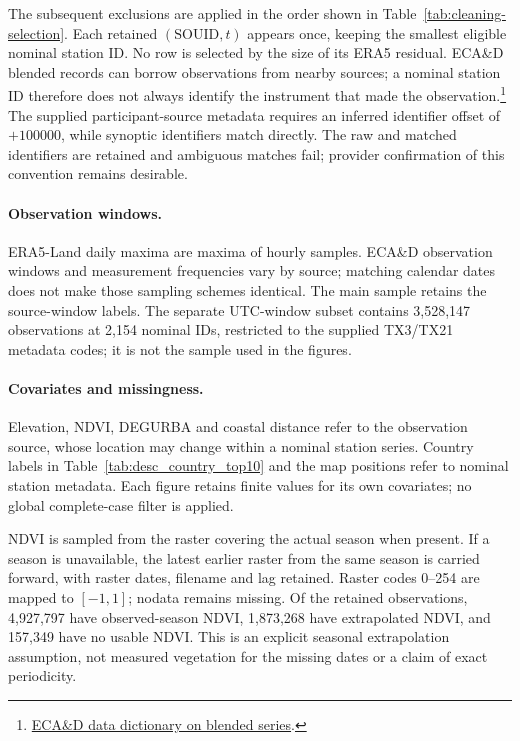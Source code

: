 \documentclass[a4paper,12pt,leqno]{article}
\begin{document}
The subsequent exclusions are applied in the order shown in
Table~\ref{tab:cleaning-selection}. Each retained $(\mathrm{SOUID},t)$
appears once, keeping the smallest eligible nominal station ID. No row
is selected by the size of its ERA5 residual. ECA\&D blended records can
borrow observations from nearby sources; a nominal station ID therefore
does not always identify the instrument that made the observation.\footnote{\href{https://www.ecad.eu/dailydata/datadictionary.php}{ECA\&D data dictionary on blended series}.}
The supplied participant-source metadata requires an inferred identifier
offset of $+100000$, while synoptic identifiers match directly. The raw
and matched identifiers are retained and ambiguous matches fail; provider
confirmation of this convention remains desirable.



\paragraph{Observation windows.}
ERA5-Land daily maxima are maxima of hourly samples. ECA\&D observation
windows and measurement frequencies vary by source; matching calendar
dates does not make those sampling schemes identical. The main sample
retains the source-window labels. The separate UTC-window subset contains
3,528,147 observations at 2,154 nominal IDs, restricted to the supplied
TX3/TX21 metadata codes; it is not the sample used in the figures.

\paragraph{Covariates and missingness.}
Elevation, NDVI, DEGURBA and coastal distance refer to the observation
source, whose location may change within a nominal station series.
Country labels in Table~\ref{tab:desc_country_top10} and the map positions
refer to nominal station metadata. Each figure retains finite values for
its own covariates; no global complete-case filter is applied.

NDVI is sampled from the raster covering the actual season when present.
If a season is unavailable, the latest earlier raster from the same season
is carried forward, with raster dates, filename and lag retained.
Raster codes 0--254 are mapped to $[-1,1]$; nodata remains missing.
Of the retained observations, 4,927,797 have observed-season NDVI,
1,873,268 have extrapolated NDVI, and 157,349 have no usable NDVI.
This is an explicit seasonal extrapolation assumption, not measured
vegetation for the missing dates or a claim of exact periodicity.
\end{document}
